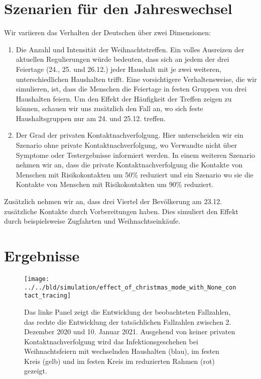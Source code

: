 \documentclass[a4paper,11pt,leqno,fleqn]{article}
\begin{document}
\section{Szenarien für den Jahreswechsel}

Wir variieren das Verhalten der Deutschen über zwei Dimensionen:

\begin{enumerate}
    \item Die Anzahl und Intensität der Weihnachtstreffen.
    Ein volles Ausreizen der aktuellen Regulierungen würde bedeuten, dass sich an jedem der drei Feiertage (24., 25. und 26.12.) jeder Haushalt mit je zwei weiteren, unterschiedlichen Haushalten trifft. Eine vorsichtigere Verhaltensweise, die wir simulieren, ist, dass die Menschen die Feiertage in festen Gruppen von drei Haushalten feiern. Um den Effekt der Häufigkeit der Treffen zeigen zu können, schauen wir uns zusätzlich den Fall an, wo sich feste Haushaltsgruppen nur am 24. und 25.12. treffen.
    \item Der Grad der privaten Kontaktnachverfolgung. Hier unterscheiden wir ein Szenario ohne private Kontaktnachverfolgung, wo Verwandte nicht über Symptome oder Testergebnisse informiert werden. In einem weiteren Szenario nehmen wir an, dass die private Kontaktnachverfolgung die Kontakte von Menschen mit Risikokontakten um 50\% reduziert und ein Szenario wo sie die Kontakte von Menschen mit Risikokontakten um 90\% reduziert.
\end{enumerate}

Zusätzlich nehmen wir an, dass drei Viertel der Bevölkerung am 23.12. zusätzliche Kontakte durch Vorbereitungen haben. Dies simuliert den Effekt durch beispielsweise Zugfahrten und Weihnachtseinkäufe.

\FloatBarrier
\section{Ergebnisse}


\begin{figure}
\label{fig:effect_of_christmas_without_contact_tracing}
\texttt{[image: ../../bld/simulation/effect\_of\_christmas\_mode\_with\_None\_contact\_tracing]}
\caption{
    Das linke Panel zeigt die Entwicklung der beobachteten Fallzahlen, das rechte die Entwicklung der tatsächlichen Fallzahlen zwischen 2. Dezember 2020 und 10. Januar 2021. Ausgehend von keiner privaten Kontaktnachverfolgung wird das Infektionsgeschehen bei Weihnachtsfeiern mit wechselnden Haushalten (blau), im festen Kreis (gelb) und im festen Kreis im reduzierten Rahmen (rot) gezeigt.
}
\end{figure}
\end{document}
